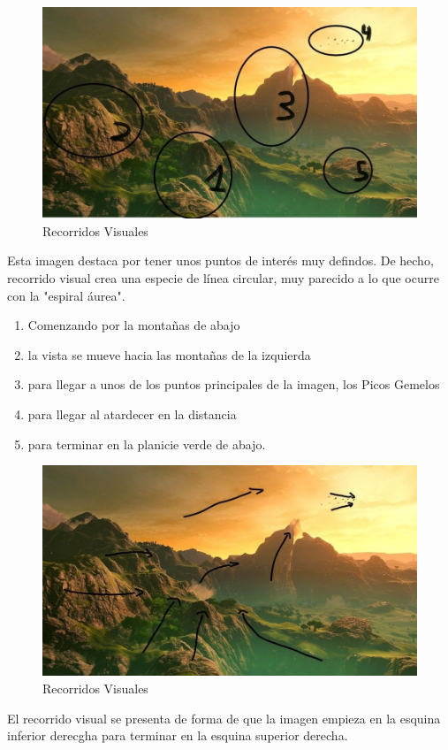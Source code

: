 \documentclass[12pt]{article}
\begin{document}
          \begin{figure}[H]
            \centering
            \includegraphics[scale = 0.5]{Jesus/Seccion16/Fondo5.JPEG}
            \caption{Recorridos Visuales}
          \end{figure}
          Esta imagen destaca por tener unos puntos de interés muy defindos. 
          De hecho, recorrido visual crea una especie de línea circular, muy parecido a lo que ocurre con la "espiral áurea". 

          \begin{enumerate}
            \item Comenzando por la montañas de abajo 
            \item la vista se mueve hacia las montañas de la izquierda
            \item para llegar a unos de los puntos principales de la imagen, los Picos Gemelos
            \item para llegar al atardecer en la distancia
            \item para terminar en la planicie verde de abajo.
          \end{enumerate}

          \begin{figure}[H]
            \centering
            \includegraphics[scale = 0.5]{Jesus/Seccion16/Fondo2.JPEG}
            \caption{Recorridos Visuales}
          \end{figure}
	          El recorrido visual se presenta de forma de que la imagen empieza en la esquina inferior derecgha para terminar en la esquina superior derecha.
\end{document}
